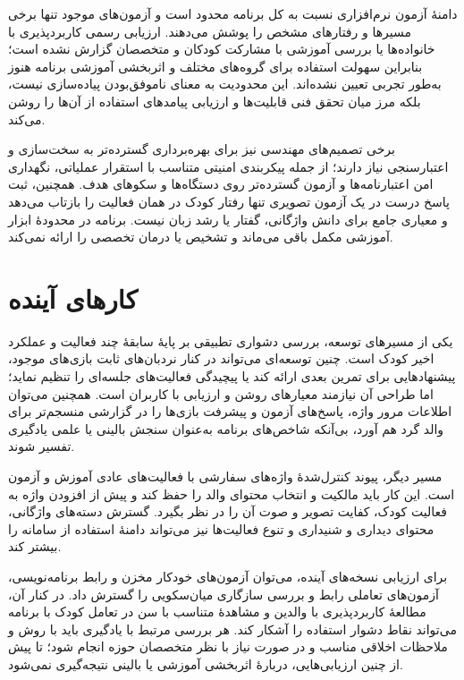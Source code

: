 دامنهٔ آزمون نرم‌افزاری نسبت به کل برنامه محدود است و آزمون‌های موجود تنها برخی مسیرها و رفتارهای مشخص را پوشش می‌دهند. ارزیابی رسمی کاربردپذیری با خانواده‌ها یا بررسی آموزشی با مشارکت کودکان و متخصصان گزارش نشده است؛ بنابراین سهولت استفاده برای گروه‌های مختلف و اثربخشی آموزشی برنامه هنوز به‌طور تجربی تعیین نشده‌اند. این محدودیت به معنای ناموفق‌بودن پیاده‌سازی نیست، بلکه مرز میان تحقق فنی قابلیت‌ها و ارزیابی پیامدهای استفاده از آن‌ها را روشن می‌کند.

برخی تصمیم‌های مهندسی نیز برای بهره‌برداری گسترده‌تر به سخت‌سازی و اعتبارسنجی نیاز دارند؛ از جمله پیکربندی امنیتی متناسب با استقرار عملیاتی، نگهداری امن اعتبارنامه‌ها و آزمون گسترده‌تر روی دستگاه‌ها و سکوهای هدف. همچنین، ثبت پاسخ درست در یک آزمون تصویری تنها رفتار کودک در همان فعالیت را بازتاب می‌دهد و معیاری جامع برای دانش واژگانی، گفتار یا رشد زبان نیست. برنامه در محدودهٔ ابزار آموزشی مکمل باقی می‌ماند و تشخیص یا درمان تخصصی را ارائه نمی‌کند.

\section{کارهای آینده}

یکی از مسیرهای توسعه، بررسی دشواری تطبیقی بر پایهٔ سابقهٔ چند فعالیت و عملکرد اخیر کودک است. چنین توسعه‌ای می‌تواند در کنار نردبان‌های ثابت بازی‌های موجود، پیشنهادهایی برای تمرین بعدی ارائه کند یا پیچیدگی فعالیت‌های جلسه‌ای را تنظیم نماید؛ اما طراحی آن نیازمند معیارهای روشن و ارزیابی با کاربران است. همچنین می‌توان اطلاعات مرور واژه، پاسخ‌های آزمون و پیشرفت بازی‌ها را در گزارشی منسجم‌تر برای والد گرد هم آورد، بی‌آنکه شاخص‌های برنامه به‌عنوان سنجش بالینی یا علمی یادگیری تفسیر شوند.

مسیر دیگر، پیوند کنترل‌شدهٔ واژه‌های سفارشی با فعالیت‌های عادی آموزش و آزمون است. این کار باید مالکیت و انتخاب محتوای والد را حفظ کند و پیش از افزودن واژه به فعالیت کودک، کفایت تصویر و صوت آن را در نظر بگیرد. گسترش دسته‌های واژگانی، محتوای دیداری و شنیداری و تنوع فعالیت‌ها نیز می‌تواند دامنهٔ استفاده از سامانه را بیشتر کند.

برای ارزیابی نسخه‌های آینده، می‌توان آزمون‌های خودکار مخزن و رابط برنامه‌نویسی، آزمون‌های تعاملی رابط و بررسی سازگاری میان‌سکویی را گسترش داد. در کنار آن، مطالعهٔ کاربردپذیری با والدین و مشاهدهٔ متناسب با سن در تعامل کودک با برنامه می‌تواند نقاط دشوار استفاده را آشکار کند. هر بررسی مرتبط با یادگیری باید با روش و ملاحظات اخلاقی مناسب و در صورت نیاز با نظر متخصصان حوزه انجام شود؛ تا پیش از چنین ارزیابی‌هایی، دربارهٔ اثربخشی آموزشی یا بالینی نتیجه‌گیری نمی‌شود.

